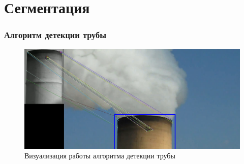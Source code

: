 \documentclass[t]{beamer}
\begin{document}
\section{Сегментация}

	\begin{frame}
		\frametitle{Алгоритм детекции трубы}
		\vspace*{0.6cm}
		\begin{figure}[h!]
			\centering
			\includegraphics[width = \textwidth]{image/match1}
			\caption{Визуализация работы алгоритма детекции трубы}
			\label{fig:fullprepare}
		\end{figure}
	\end{frame}	
\end{document}
